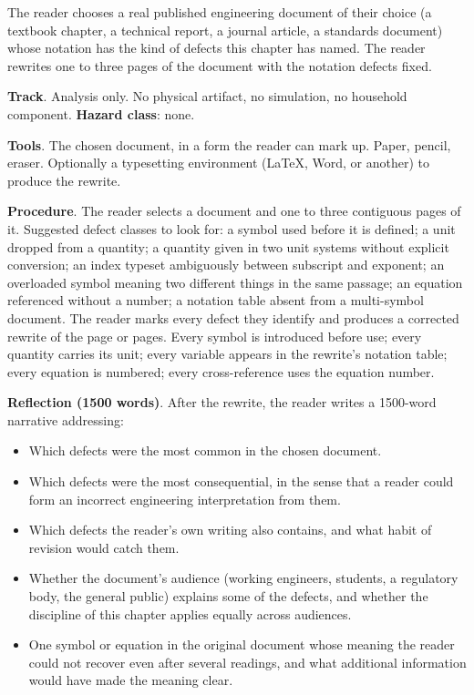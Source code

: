 \begin{project}
The reader chooses a real published engineering document of their
choice (a textbook chapter, a technical report, a journal article, a
standards document) whose notation has the kind of defects this
chapter has named. The reader rewrites one to three pages of the
document with the notation defects fixed.

\textbf{Track}. Analysis only. No physical artifact, no simulation,
no household component. \textbf{Hazard class}: none.

\textbf{Tools}. The chosen document, in a form the reader can mark
up. Paper, pencil, eraser. Optionally a typesetting environment
(LaTeX, Word, or another) to produce the rewrite.

\textbf{Procedure}. The reader selects a document and one to three
contiguous pages of it. Suggested defect classes to look for: a
symbol used before it is defined; a unit dropped from a quantity;
a quantity given in two unit systems without explicit conversion; an
index typeset ambiguously between subscript and exponent; an
overloaded symbol meaning two different things in the same passage;
an equation referenced without a number; a notation table absent
from a multi-symbol document. The reader marks every defect they
identify and produces a corrected rewrite of the page or pages.
Every symbol is introduced before use; every quantity carries its
unit; every variable appears in the rewrite's notation table; every
equation is numbered; every cross-reference uses the equation
number.

\textbf{Reflection (1500 words)}. After the rewrite, the reader
writes a 1500-word narrative addressing:

\begin{itemize}[leftmargin=*]
  \item Which defects were the most common in the chosen document.
  \item Which defects were the most consequential, in the sense
    that a reader could form an incorrect engineering interpretation
    from them.
  \item Which defects the reader's own writing also contains, and
    what habit of revision would catch them.
  \item Whether the document's audience (working engineers, students,
    a regulatory body, the general public) explains some of the
    defects, and whether the discipline of this chapter applies
    equally across audiences.
  \item One symbol or equation in the original document whose meaning
    the reader could not recover even after several readings, and
    what additional information would have made the meaning clear.
\end{itemize}


\end{project}
